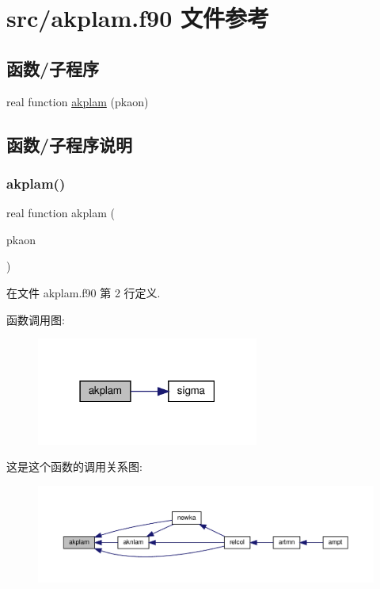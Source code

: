 \hypertarget{akplam_8f90}{}\section{src/akplam.f90 文件参考}
\label{akplam_8f90}
\subsection*{函数/子程序}
\begin{DoxyCompactItemize}
\item 
real function \mbox{\hyperlink{akplam_8f90_a6b856a0e6f74f952236b3413c823ca43}{akplam}} (pkaon)
\end{DoxyCompactItemize}


\subsection{函数/子程序说明}
\mbox{\label{akplam_8f90_a6b856a0e6f74f952236b3413c823ca43}} 
\subsubsection{\texorpdfstring{akplam()}{akplam()}}
{\footnotesize\ttfamily real function akplam (\begin{DoxyParamCaption}\item[{}]{pkaon }\end{DoxyParamCaption})}



在文件 akplam.\+f90 第 2 行定义.

函数调用图\+:
\nopagebreak
\begin{figure}[H]
\begin{center}
\leavevmode
\includegraphics[width=207pt]{akplam_8f90_a6b856a0e6f74f952236b3413c823ca43_cgraph}
\end{center}
\end{figure}
这是这个函数的调用关系图\+:
\nopagebreak
\begin{figure}[H]
\begin{center}
\leavevmode
\includegraphics[width=350pt]{akplam_8f90_a6b856a0e6f74f952236b3413c823ca43_icgraph}
\end{center}
\end{figure}

